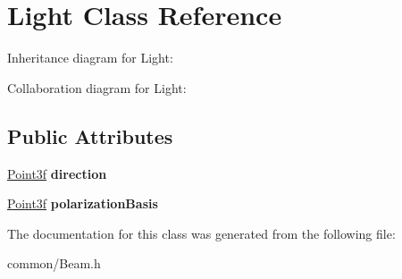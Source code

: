 \hypertarget{class_light}{}\section{Light Class Reference}
\label{class_light}


Inheritance diagram for Light\+:


Collaboration diagram for Light\+:
\subsection*{Public Attributes}
\begin{DoxyCompactItemize}
\item 
\mbox{\label{class_light_a91da59909da262125f2666e021540d91}} 
\mbox{\hyperlink{struct_point3f}{Point3f}} {\bfseries direction}
\item 
\mbox{\label{class_light_a7a8f39612eb3949f754817a5fe843ac5}} 
\mbox{\hyperlink{struct_point3f}{Point3f}} {\bfseries polarization\+Basis}
\end{DoxyCompactItemize}


The documentation for this class was generated from the following file\+:\begin{DoxyCompactItemize}
\item 
common/Beam.\+h\end{DoxyCompactItemize}
